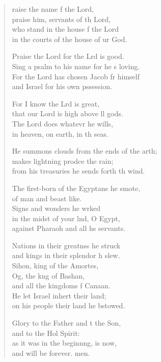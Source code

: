 \begin{verse}
  \begin{patverse}
raise the name f the Lord,\Med\\
praise him, servants of th Lord,\\
who stand in the house f the Lord\Med\\
in the courts of the house of ur God.

Praise the Lord for the Lrd is good.\Med\\
Sing a psalm to his name for he \pointup{\i}s loving.\\
For the Lord has chosen Jacob fr himself\Med\\
and Israel for his own pssession.

For I know the Lrd is great,\Med\\
that our Lord is high above ll gods.\\
The Lord does whatevr he wills,\Med\\
in heaven, on earth, in th seas.

He summons clouds from the ends of the arth;\Flex\\
makes lightning prodce the rain;\Med\\
from his treasuries he sends forth th wind.

The first-born of the Egypt\pointup{\i}ans he smote,\Med\\
of man and beast like.\\
Signs and wonders he wrked\Flex\\
in the midst of your lnd, O Egypt,\Med\\
against Pharaoh and all h\pointup{\i}s servants.

Nations in their greatnss he struck\Med\\
and kings in their splendor h slew.\\
Sihon, king of the Amor\pointup{\i}tes,\Flex\\
Og, the k\pointup{\i}ng of Bashan,\Med\\
and all the kingdoms f Canaan.\\
He let Israel inher\pointup{\i}t their land;\Med\\
on his people their land he bstowed.

Glory to the Father and t the Son,\Med\\
and to the Hol Spirit:\\
as it was in the beginn\pointup{\i}ng, is now,\Med\\
and will be forever. men.
  \end{patverse}
\end{verse}
